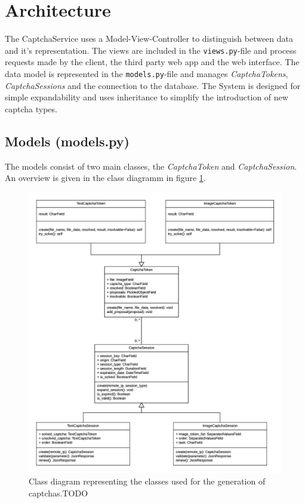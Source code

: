 \section{Architecture}
\label{sec:architecture}

The CaptchaService uses a Model-View-Controller to distinguish between data and it's representation. The views are included in the \verb|views.py|-file and process requests made by the client, the third party web app and the web interface. 
The data model is represented in the \verb|models.py|-file and manages \emph{CaptchaTokens}, \emph{CaptchaSessions} and the connection to the database.
The System is designed for simple expandability and uses inheritance to simplify the introduction of new captcha types. 

\subsection{Models (models.py)}

The models consist of two main classes, the \emph{CaptchaToken} and \emph{CaptchaSession}. An overview is given in the class diagramm in figure \ref{fig:classdia}. 

\begin{figure}[!h]
\centering
\includegraphics[width=1.1\linewidth]{content/figures/classdiagramm.png}
\caption{Class diagram representing the classes used for the generation of captchas.TODO
}
\label{fig:classdia}
\end{figure}

